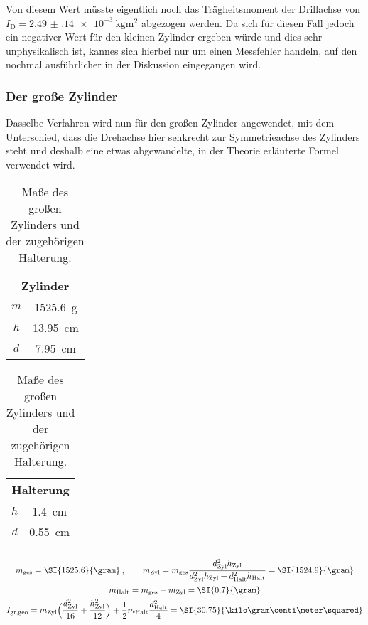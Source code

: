 Von diesem Wert müsste eigentlich noch das Trägheitsmoment der Drillachse von ${I_\text{D}=\SI{2.49(14)e-3}{\kilo\gram\meter\squared}}$ 
abgezogen werden. Da sich für diesen Fall jedoch ein negativer Wert für den kleinen Zylinder ergeben würde und dies sehr 
unphysikalisch ist, kannes sich hierbei nur um einen Messfehler handeln, auf den nochmal ausführlicher in der Diskussion 
eingegangen wird. 

\FloatBarrier
\subsubsection{Der große Zylinder}

Dasselbe Verfahren wird nun für den großen Zylinder angewendet, mit dem Unterschied, dass die Drehachse hier senkrecht zur 
Symmetrieachse des Zylinders steht und deshalb eine etwas abgewandelte, in der Theorie erläuterte Formel verwendet wird. 

\begin{table}
    \centering
    \caption{Maße des großen Zylinders und der zugehörigen Halterung.}
    \label{tab:groZyl}
    \begin{tabular}{c c}
        \toprule
        \multicolumn{2}{c}{Zylinder}\\
        \midrule
        $m$ & \SI{1525.6}{\gram} \\
        $h$ & \SI{13.95}{\centi\meter} \\
        $d$ & \SI{7.95}{\centi\meter} \\
        \bottomrule
    \end{tabular}
    \qquad \qquad 
    \begin{tabular}{c c}
        \toprule
        \multicolumn{2}{c}{Halterung}\\
        \midrule
        $h$ & \SI{1.4}{\centi\meter} \\
        $d$ & \SI{0.55}{\centi\meter} \\ 
        \bottomrule
            \\
    \end{tabular}
\end{table}

\begin{gather}
    m_\text{ges}=\SI{1525.6}{\gram}\:, \qquad 
    m_\text{Zyl}=m_\text{ges}\frac{d_\text{Zyl}^2h_\text{Zyl}}{d_\text{Zyl}^2h_\text{Zyl}+d_\text{Halt}^2h_\text{Halt}}=\SI{1524.9}{\gram} \\
    m_\text{Halt} = m_\text{ges}-m_\text{Zyl}=\SI{0.7}{\gram} \\
    I_\text{gr,geo}=m_\text{Zyl} \Bigl( \frac{d_\text{Zyl}^2}{16} + \frac{h_\text{Zyl}^2}{12} \Bigr) 
        +\frac{1}{2}m_\text{Halt}\frac{d_\text{Halt}^2}{4}=\SI{30.75}{\kilo\gram\centi\meter\squared}
\end{gather}

